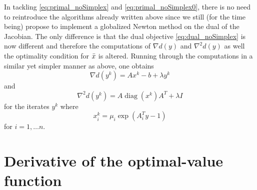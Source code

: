 \documentclass[10pt,a4paper]{article}
\numberwithin{equation}{section}
\theoremstyle{definition}
\def\rr{{\mathbb R}}
\DeclareMathOperator{\diag}{diag}
\DeclareMathOperator{\softmax}{softmax}
\begin{document}
In tackling \eqref{eq:primal_noSimplex} and \eqref{eq:primal_noSimplex0}, there is no need to reintroduce the algorithms already written above since we still (for the time being) propose to implement a globalized Newton method on the dual of the Jacobian. The only difference is that the dual objective \eqref{eq:dual_noSimplex} is now different and therefore the computations of $\nabla d(y)$ and $\nabla^2 d(y)$ as well the optimality condition for $\Bar{x}$ is altered. Running through the computations in a similar yet simpler manner as above, one obtains 
\[
\nabla d(y^k) = Ax^k - b + \lambda y^k
\]
and 
\[
\nabla^2 d(y^k) = A \diag(x^k)A^T + \lambda I
\]
for the iterates $y^k$ where 
\[
x^k_i = \mu_i \exp{(A_i^Ty - 1)}
\]
for $i = 1, \dots n$.







\section{Derivative of the optimal-value function}
\end{document}

